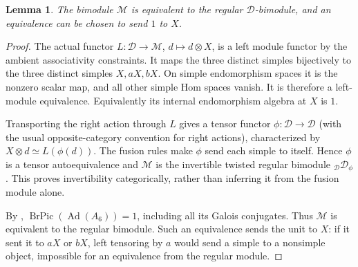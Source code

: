 \documentclass[11pt]{article}
\newtheorem{lemma}{Lemma}
\begin{document}
\begin{lemma}
The bimodule $\mathcal M$ is equivalent to the regular
$\mathcal D$-bimodule, and an equivalence can be chosen to send $1$ to $X$.
\end{lemma}
\begin{proof}
The actual functor $L:\mathcal D\to\mathcal M$, $d\mapsto d\otimes X$,
is a left module functor by the ambient associativity constraints.
It maps the three distinct simples bijectively to the three distinct simples
$X,aX,bX$. On simple endomorphism spaces it is the nonzero scalar map,
and all other simple Hom spaces vanish. It is therefore a left-module
equivalence. Equivalently its internal endomorphism algebra at $X$ is $1$.

Transporting the right action through $L$ gives a tensor functor
$\phi:\mathcal D\to\mathcal D$ (with the usual opposite-category convention
for right actions), characterized by
$X\otimes d\simeq L(\phi(d))$. The fusion rules make $\phi$ send each
simple to itself. Hence $\phi$ is a tensor autoequivalence and
$\mathcal M$ is the invertible twisted regular bimodule
${}_{\mathcal D}\mathcal D_{\phi}$.
This proves invertibility categorically, rather than inferring it from the
fusion module alone.

By \cite[Theorem 1.2]{EM},
$\operatorname{BrPic}(\operatorname{Ad}(A_6))=1$, including all its Galois
conjugates. Thus $\mathcal M$ is equivalent to the regular bimodule.
Such an equivalence sends the unit to $X$: if it sent it to $aX$ or $bX$,
left tensoring by $a$ would send a simple to a nonsimple object, impossible
for an equivalence from the regular module.
\end{proof}
\end{document}
